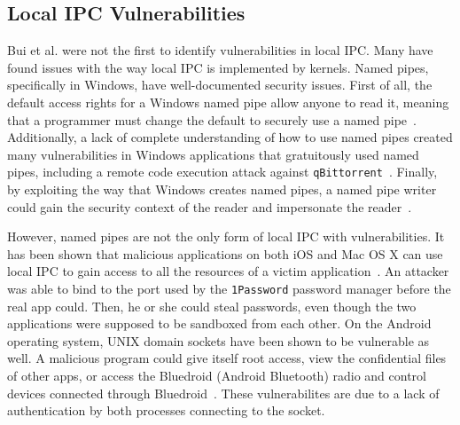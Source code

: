\subsection{Local IPC Vulnerabilities}
\label{sec:localIPCVulnerabilities}
Bui et al. were not the first to identify vulnerabilities in local IPC.  Many have found issues with the way local IPC is implemented by kernels.  Named pipes, specifically in Windows, have well-documented security issues.  First of all, the default access rights for a Windows named pipe allow anyone to read it, meaning that a programmer must change the default to securely use a named pipe~\cite{microsoft_2018}.  Additionally, a lack of complete understanding of how to use named pipes created many vulnerabilities in Windows applications that gratuitously used named pipes, including a remote code execution attack against \texttt{qBittorrent}~\cite{cohen_2019}.  Finally, by exploiting the way that Windows creates named pipes, a named pipe writer could gain the security context of the reader and impersonate the reader~\cite{watts2002discovering}.

However, named pipes are not the only form of local IPC with vulnerabilities.  It has been shown that malicious applications on both iOS and Mac OS X can use local IPC to gain access to all the resources of a victim application~\cite{Xing_2015_CAI_2810103_2813609}.  An attacker was able to bind to the port used by the \texttt{1Password} password manager before the real app could.  Then, he or she could steal passwords, even though the two applications were supposed to be sandboxed from each other.  On the Android operating system, UNIX domain sockets have been shown to be vulnerable as well.  A malicious program could give itself root access, view the confidential files of other apps, or access the Bluedroid (Android Bluetooth) radio and control devices connected through Bluedroid~\cite{Shao_2016_MAU_2976749_2978297}.  These vulnerabilites are due to a lack of authentication by both processes connecting to the socket.